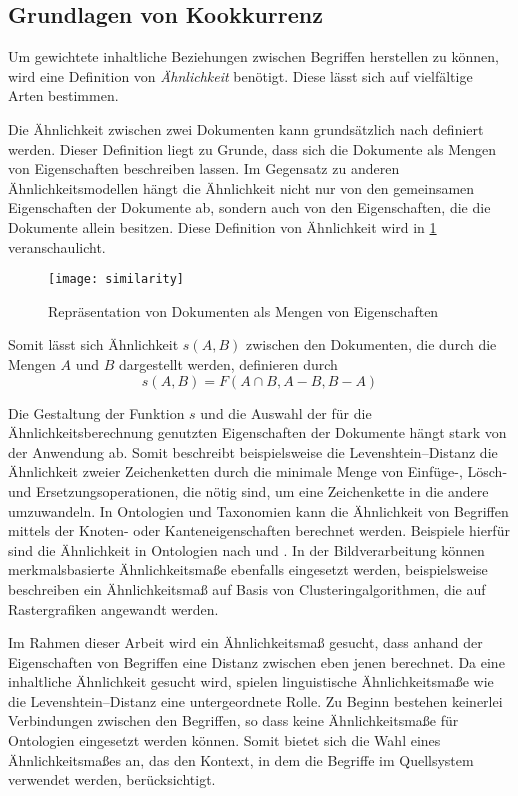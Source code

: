 \subsection{Grundlagen von Kookkurrenz}

Um gewichtete inhaltliche Beziehungen zwischen Begriffen herstellen zu können, wird eine Definition von \emph{Ähnlichkeit} benötigt. Diese lässt sich auf vielfältige Arten bestimmen.

Die Ähnlichkeit zwischen zwei Dokumenten kann grundsätzlich nach \textcite{at1977} definiert werden. Dieser Definition liegt zu Grunde, dass sich die Dokumente als Mengen von Eigenschaften beschreiben lassen. Im Gegensatz zu anderen Ähnlichkeitsmodellen hängt die Ähnlichkeit nicht nur von den gemeinsamen Eigenschaften der Dokumente ab, sondern auch von den Eigenschaften, die die Dokumente allein besitzen. Diese Definition von Ähnlichkeit wird in \cref{fig:similarity} veranschaulicht.

\begin{figure}
\centering
\texttt{[image: similarity]}
\caption{Repräsentation von Dokumenten als Mengen von Eigenschaften}
\label{fig:similarity}
\end{figure}

Somit lässt sich Ähnlichkeit \(s(A,B)\) zwischen den Dokumenten, die durch die Mengen \(A\) und \(B\) dargestellt werden, definieren durch
\[s(A,B) = F(A \cap B, A-B, B-A)\]
\label{similarity}

Die Gestaltung der Funktion \(s\) und die Auswahl der für die Ähnlichkeitsberechnung genutzten Eigenschaften der Dokumente hängt stark von der Anwendung ab. Somit beschreibt beispielsweise die Levenshtein--Distanz \cite{vl1966} die Ähnlichkeit zweier Zeichenketten durch die minimale Menge von Einfüge-, Lösch- und Ersetzungsoperationen, die nötig sind, um eine Zeichenkette in die andere umzuwandeln. In Ontologien und Taxonomien kann die Ähnlichkeit von Begriffen mittels der Knoten- oder Kanteneigenschaften berechnet werden. Beispiele hierfür sind die Ähnlichkeit in Ontologien nach \textcite{pr1995} und \textcite{ps2002}. In der Bildverarbeitung können merkmalsbasierte Ähnlichkeitsmaße ebenfalls eingesetzt werden, beispielsweise beschreiben \textcite{ow2006} ein Ähnlichkeitsmaß auf Basis von Clusteringalgorithmen, die auf Rastergrafiken angewandt werden.

Im Rahmen dieser Arbeit wird ein Ähnlichkeitsmaß gesucht, dass anhand der Eigenschaften von Begriffen eine Distanz zwischen eben jenen berechnet. Da eine inhaltliche Ähnlichkeit gesucht wird, spielen linguistische Ähnlichkeitsmaße wie die Levenshtein--Distanz eine untergeordnete Rolle. Zu Beginn bestehen keinerlei Verbindungen zwischen den Begriffen, so dass keine Ähnlichkeitsmaße für Ontologien eingesetzt werden können. Somit bietet sich die Wahl eines Ähnlichkeitsmaßes an, das den Kontext, in dem die Begriffe im Quellsystem verwendet werden, berücksichtigt.

